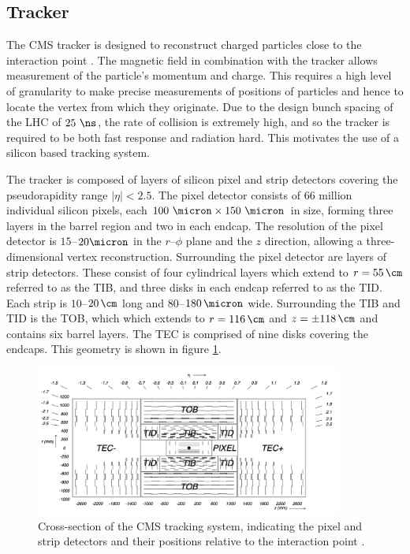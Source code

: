 \subsection{Tracker}
\label{sec:tracker}

The CMS tracker is designed to reconstruct charged particles close to the
interaction point \cite{Chatrchyan:2008aa}. The magnetic field in combination with the tracker allows
measurement of the particle's momentum and charge. This requires a high level of
granularity to make precise measurements of positions of particles and hence to
locate the vertex from which they originate. Due to the design bunch spacing
of the LHC of $25~\ns$, the rate of collision is extremely high, and so the tracker is
required to be both fast response and radiation hard. This motivates the use of a
silicon based tracking system.

The tracker is composed of layers of silicon pixel and strip detectors covering
the pseudorapidity range $|\eta| < 2.5$. The pixel detector consists of 66
million individual silicon pixels, each $100~\micron \times 150~\micron$
in size, forming three layers in the barrel region and two in each endcap. The
resolution of the pixel detector is $15$--$20\micron$ in the $r$--$\phi$ plane
and the $z$ direction, allowing a three-dimensional vertex reconstruction.
Surrounding the pixel detector are layers of strip detectors. These consist of
four cylindrical layers which extend to $r=55\,\cm$ referred to as the
\ac{TIB}, and three disks in each endcap referred to as the \ac{TID}. Each strip
is $10$--$20\,\cm$ long and $80$--$180\,\micron$ wide. Surrounding the \ac{TIB}
and \ac{TID} is the \ac{TOB}, which which extends to $r=116\,\cm$ and
$z=\pm118\,\cm$ and contains six barrel layers. The \ac{TEC} is comprised of nine
disks covering the endcaps. This geometry is shown in figure
\ref{fig:trackerlayout}.

\begin{figure}[htbp]
   \includegraphics[width=0.9\textwidth]{plots/detector/tracker_layout.png}
\caption[Cross-section of the CMS tracking system, indicating the pixel and
strip detectors and their positions relative to the interaction point.]
{Cross-section of the CMS tracking system, indicating the pixel and
strip detectors and their positions relative to the interaction point \cite{Chatrchyan:2008aa}.}
\label{fig:trackerlayout}
\end{figure}

